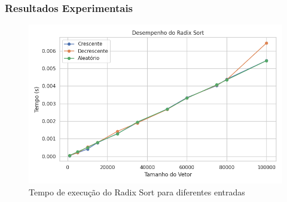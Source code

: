 \subsubsection{Resultados Experimentais}
\begin{figure}[H]
    \centering
    \includegraphics[width=1\textwidth]{../codigos/resultados/radix_grafico.png}
    \caption{Tempo de execução do Radix Sort para diferentes entradas}
    \label{fig:radix-grafico}
\end{figure}
